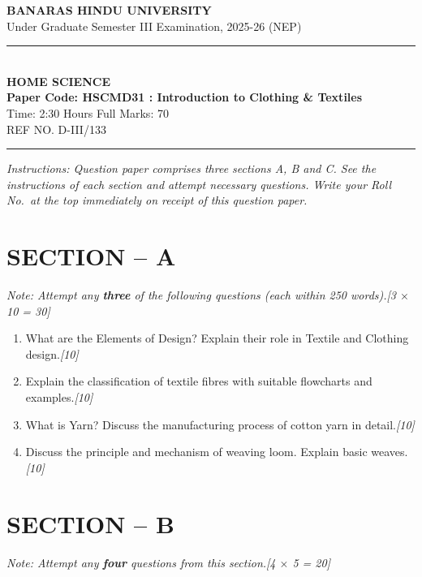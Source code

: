 \documentclass[11pt,a4paper]{article}
\newcommand{\pts}[1]{\hfill \textit{[#1]}}
\begin{document}
\begin{center}
  {\large\bfseries BANARAS HINDU UNIVERSITY}\\[2pt]
  {\normalsize Under Graduate Semester III Examination, 2025-26 (NEP)}\\[6pt]
  \rule{0.8\linewidth}{0.5pt}\\[6pt]
  {\large\bfseries HOME SCIENCE}\\[4pt]
  {\large\bfseries Paper Code: HSCMD31 : Introduction to Clothing \& Textiles}\\[4pt]
  {\normalsize Time: 2:30 Hours \hfill Full Marks: 70}\\[2pt]
  {\small REF NO. D-III/133}
\end{center}
\rule{\linewidth}{0.4pt}
\smallskip

\noindent \textit{Instructions: Question paper comprises three sections A, B and C. See the instructions of each section and attempt necessary questions. Write your Roll No.\ at the top immediately on receipt of this question paper.}

\bigskip

\section*{SECTION -- A}
\noindent \textit{Note: Attempt any \textbf{three} of the following questions (each within 250 words).}\pts{3 $\times$ 10 = 30}

\begin{enumerate}[label=\textbf{\arabic*.},leftmargin=*,itemsep=10pt]

  \item What are the Elements of Design? Explain their role in Textile and Clothing design.\pts{10}

  \item Explain the classification of textile fibres with suitable flowcharts and examples.\pts{10}

  \item What is Yarn? Discuss the manufacturing process of cotton yarn in detail.\pts{10}

  \item Discuss the principle and mechanism of weaving loom. Explain basic weaves.\pts{10}

\end{enumerate}

\bigskip

\section*{SECTION -- B}
\noindent \textit{Note: Attempt any \textbf{four} questions from this section.}\pts{4 $\times$ 5 = 20}
\end{document}

